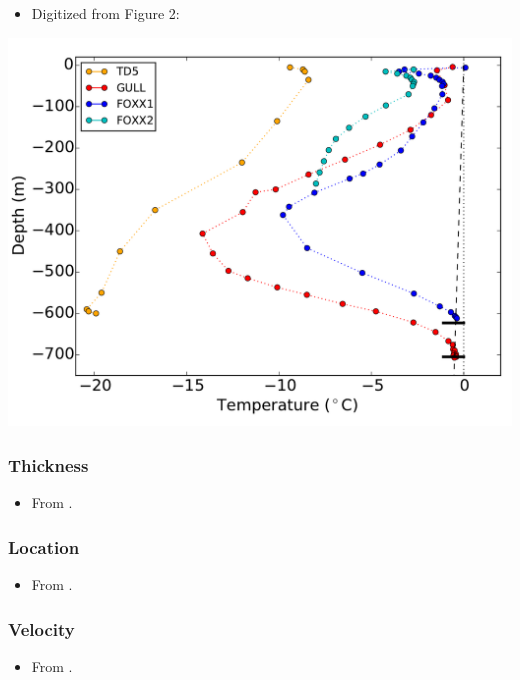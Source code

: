 \documentclass[article,a4paper,times,11pt,twoside]{article}
\begin{document}
\begin{itemize}
\item Digitized from \textcite{luthi_2015} Figure 2:
\end{itemize}

\begin{center}
\includegraphics[width=.9\linewidth]{foxx1/luthi_2015_fig2_all.png}
\end{center}

\subsubsection{Thickness}
\label{sec:org0789619}

\begin{itemize}
\item From \textcite{ryser_2014_caterpillar}.
\end{itemize}

\subsubsection{Location}
\label{sec:org628c105}

\begin{itemize}
\item From \textcite{ryser_2014_caterpillar}.
\end{itemize}

\subsubsection{Velocity}
\label{sec:orgaef1518}

\begin{itemize}
\item From \textcite{ryser_2014_caterpillar}.
\end{itemize}
\end{document}
